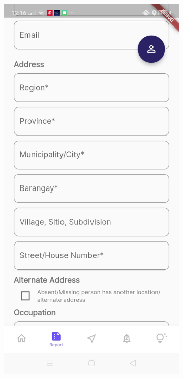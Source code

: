 \begin{figure}[!h]
\begin{subfigure}[c]{0.30\linewidth}
    \end{subfigure}
        \centering
    \begin{subfigure}[c]{0.30\linewidth}
        \centering
        \includegraphics[scale=0.15]{figures/Chapter4/Main/p3-4.jpg}

\end{subfigure}
\end{figure}
